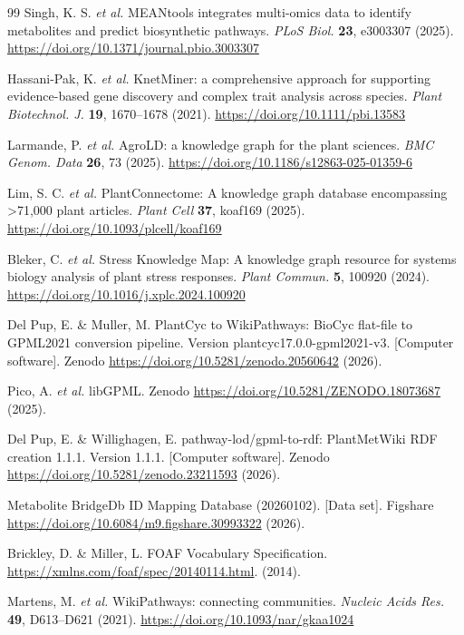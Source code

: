 \documentclass[11pt,a4paper]{article}
\begin{document}
\begin{thebibliography}{99}
Singh, K. S. \textit{et al.} MEANtools integrates multi-omics data to identify metabolites and predict biosynthetic pathways. \textit{PLoS Biol.} \textbf{23}, e3003307 (2025). \url{https://doi.org/10.1371/journal.pbio.3003307}

Hassani-Pak, K. \textit{et al.} KnetMiner: a comprehensive approach for supporting evidence-based gene discovery and complex trait analysis across species. \textit{Plant Biotechnol. J.} \textbf{19}, 1670--1678 (2021). \url{https://doi.org/10.1111/pbi.13583}

Larmande, P. \textit{et al.} AgroLD: a knowledge graph for the plant sciences. \textit{BMC Genom. Data} \textbf{26}, 73 (2025). \url{https://doi.org/10.1186/s12863-025-01359-6}

Lim, S. C. \textit{et al.} PlantConnectome: A knowledge graph database encompassing >71,000 plant articles. \textit{Plant Cell} \textbf{37}, koaf169 (2025). \url{https://doi.org/10.1093/plcell/koaf169}

Bleker, C. \textit{et al.} Stress Knowledge Map: A knowledge graph resource for systems biology analysis of plant stress responses. \textit{Plant Commun.} \textbf{5}, 100920 (2024). \url{https://doi.org/10.1016/j.xplc.2024.100920}

Del Pup, E. \& Muller, M. PlantCyc to WikiPathways: BioCyc flat-file to GPML2021 conversion pipeline. Version plantcyc17.0.0-gpml2021-v3. [Computer software]. Zenodo \url{https://doi.org/10.5281/zenodo.20560642} (2026).

Pico, A. \textit{et al.} libGPML. Zenodo \url{https://doi.org/10.5281/ZENODO.18073687} (2025).

Del Pup, E. \& Willighagen, E. pathway-lod/gpml-to-rdf: PlantMetWiki RDF creation 1.1.1. Version 1.1.1. [Computer software]. Zenodo \url{https://doi.org/10.5281/zenodo.23211593} (2026).

Metabolite BridgeDb ID Mapping Database (20260102). [Data set]. Figshare \url{https://doi.org/10.6084/m9.figshare.30993322} (2026).

Brickley, D. \& Miller, L. FOAF Vocabulary Specification. \url{https://xmlns.com/foaf/spec/20140114.html}. (2014).

Martens, M. \textit{et al.} WikiPathways: connecting communities. \textit{Nucleic Acids Res.} \textbf{49}, D613--D621 (2021). \url{https://doi.org/10.1093/nar/gkaa1024}


\end{thebibliography}
\end{document}
